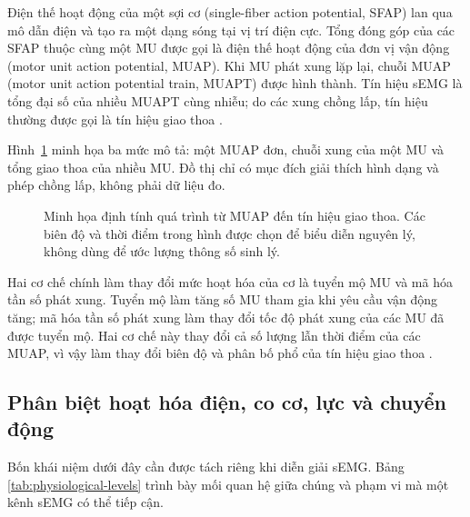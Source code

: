 Điện thế hoạt động của một sợi cơ (single-fiber action potential, SFAP) lan
qua mô dẫn điện và tạo ra một dạng sóng tại vị trí điện cực. Tổng đóng góp
của các SFAP thuộc cùng một MU được gọi là điện thế hoạt động của đơn vị
vận động (motor unit action potential, MUAP). Khi MU phát xung lặp lại,
chuỗi MUAP (motor unit action potential train, MUAPT) được hình thành. Tín
hiệu sEMG là tổng đại số của nhiều MUAPT cùng nhiễu; do các xung chồng lấp,
tín hiệu thường được gọi là tín hiệu giao thoa
\cite{campanini2022fundamental,mcmanus2020analysis,merletti2004electromyography}.

Hình~\ref{fig:muap-interference} minh họa ba mức mô tả: một MUAP đơn,
chuỗi xung của một MU và tổng giao thoa của nhiều MU. Đồ thị chỉ có mục
đích giải thích hình dạng và phép chồng lấp, không phải dữ liệu đo.

\begin{figure}[htbp]
    \centering
    
    \caption{Minh họa định tính quá trình từ MUAP đến tín hiệu giao thoa.
    Các biên độ và thời điểm trong hình được chọn để biểu diễn nguyên lý,
    không dùng để ước lượng thông số sinh lý.}
    \label{fig:muap-interference}
\end{figure}

Hai cơ chế chính làm thay đổi mức hoạt hóa của cơ là tuyển mộ MU và mã hóa
tần số phát xung. Tuyển mộ làm tăng số MU tham gia khi yêu cầu vận động
tăng; mã hóa tần số phát xung làm thay đổi tốc độ phát xung của các MU đã
được tuyển mộ.
Hai cơ chế này thay đổi cả số lượng lẫn thời điểm của các MUAP, vì vậy làm
thay đổi biên độ và phân bố phổ của tín hiệu giao thoa
\cite{mcmanus2020analysis,merletti2004electromyography}.

\subsection{Phân biệt hoạt hóa điện, co cơ, lực và chuyển động}
\label{sec:activation-vs-force}

Bốn khái niệm dưới đây cần được tách riêng khi diễn giải sEMG. Bảng
\ref{tab:physiological-levels} trình bày mối quan hệ giữa chúng và phạm vi
mà một kênh sEMG có thể tiếp cận.

